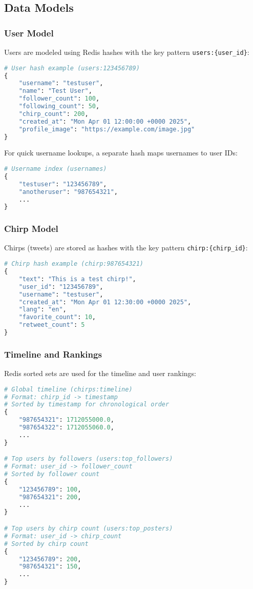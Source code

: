 \documentclass[a4paper,11pt]{article}
\begin{document}
\subsection{Data Models}

\subsubsection{User Model}
Users are modeled using Redis hashes with the key pattern \texttt{users:\{user\_id\}}:

\begin{lstlisting}[language=Python, caption=User data structure in Redis]
# User hash example (users:123456789)
{
    "username": "testuser",
    "name": "Test User",
    "follower_count": 100,
    "following_count": 50,
    "chirp_count": 200,
    "created_at": "Mon Apr 01 12:00:00 +0000 2025",
    "profile_image": "https://example.com/image.jpg"
}
\end{lstlisting}

For quick username lookups, a separate hash maps usernames to user IDs:

\begin{lstlisting}[language=Python, caption=Username to user ID mapping]
# Username index (usernames)
{
    "testuser": "123456789",
    "anotheruser": "987654321",
    ...
}
\end{lstlisting}

\subsubsection{Chirp Model}
Chirps (tweets) are stored as hashes with the key pattern \texttt{chirp:\{chirp\_id\}}:

\begin{lstlisting}[language=Python, caption=Chirp data structure in Redis]
# Chirp hash example (chirp:987654321)
{
    "text": "This is a test chirp!",
    "user_id": "123456789",
    "username": "testuser",
    "created_at": "Mon Apr 01 12:30:00 +0000 2025",
    "lang": "en",
    "favorite_count": 10,
    "retweet_count": 5
}
\end{lstlisting}

\subsubsection{Timeline and Rankings}
Redis sorted sets are used for the timeline and user rankings:

\begin{lstlisting}[language=Python, caption=Timeline and ranking data structures]
# Global timeline (chirps:timeline)
# Format: chirp_id -> timestamp
# Sorted by timestamp for chronological order
{
    "987654321": 1712055000.0,
    "987654322": 1712055060.0,
    ...
}

# Top users by followers (users:top_followers)
# Format: user_id -> follower_count
# Sorted by follower count
{
    "123456789": 100,
    "987654321": 200,
    ...
}

# Top users by chirp count (users:top_posters)
# Format: user_id -> chirp_count
# Sorted by chirp count
{
    "123456789": 200,
    "987654321": 150,
    ...
}
\end{lstlisting}
\end{document}
